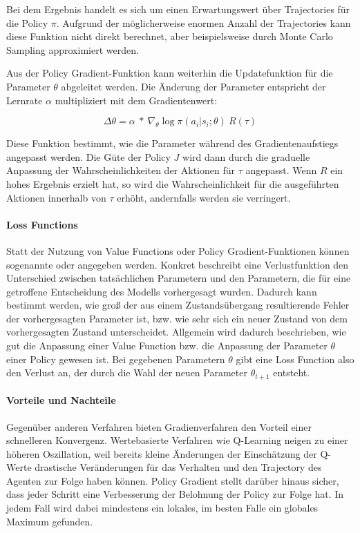 Bei dem Ergebnis handelt es sich um einen Erwartungswert über Trajectories für die Policy $\pi$. Aufgrund der möglicherweise enormen Anzahl der Trajectories kann diese Funktion nicht direkt berechnet, aber beispielsweise durch Monte Carlo Sampling approximiert werden.

Aus der Policy Gradient-Funktion kann weiterhin die Updatefunktion für die Parameter $\theta$ abgeleitet werden. Die Änderung der Parameter entspricht der Lernrate $\alpha$ multipliziert mit dem Gradientenwert:

$$  \Delta \theta   =   \alpha     \: * \:   \nabla_{\theta}   \log \pi(a_i|s_i;\theta)  \: R(\tau)   $$ 

Diese Funktion bestimmt, wie die Parameter während des Gradientenaufstiegs angepasst werden. Die Güte der Policy $J$ wird dann durch die graduelle Anpassung der Wahrscheinlichkeiten der Aktionen für $\tau$ angepasst. Wenn $R$ ein hohes Ergebnis erzielt hat, so wird die Wahrscheinlichkeit für die ausgeführten Aktionen innerhalb von $\tau$ erhöht, andernfalls werden sie verringert.



\paragraph{Loss Functions}\label{loss_functions}
Statt der Nutzung von Value Functions oder Policy Gradient-Funktionen können sogenannte  oder  angegeben werden. Konkret beschreibt eine Verlustfunktion den Unterschied zwischen tatsächlichen Parametern und den Parametern, die für eine getroffene Entscheidung des Modells vorhergesagt wurden. Dadurch kann bestimmt werden, wie groß der aus einem Zustandsübergang resultierende Fehler der vorhergesagten Parameter ist, bzw. wie sehr sich ein neuer Zustand von dem vorhergesagten Zustand unterscheidet.
Allgemein wird dadurch beschrieben, wie gut die Anpassung einer Value Function bzw. die Anpassung der Parameter $\theta$ einer Policy gewesen ist. Bei gegebenen Parametern $ \theta $ gibt eine Loss Function also den Verlust an, der durch die Wahl der neuen Parameter $\theta_{t+1} $ entsteht.


\paragraph{Vorteile und Nachteile}\label{vorteile_nachteile_gradient}

Gegenüber anderen Verfahren bieten Gradienverfahren den Vorteil einer schnelleren Konvergenz. Wertebasierte Verfahren wie Q-Learning neigen zu einer höheren Oszillation, weil bereits kleine Änderungen der Einschätzung der Q-Werte drastische Veränderungen für das Verhalten und den Trajectory des Agenten zur Folge haben können. Policy Gradient stellt darüber hinaus sicher, dass jeder Schritt eine Verbesserung der Belohnung der Policy zur Folge hat. In jedem Fall wird dabei mindestens ein lokales, im besten Falle ein globales Maximum gefunden.

